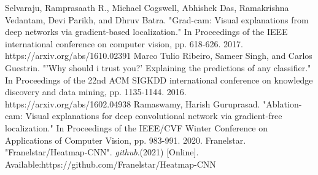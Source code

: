 \documentclass[conference]{IEEEtran}
\begin{document}
\begin{thebibliography}{00}
 Selvaraju, Ramprasaath R., Michael Cogswell, Abhishek Das, Ramakrishna Vedantam, Devi Parikh, and Dhruv Batra. "Grad-cam: Visual explanations from deep networks via gradient-based localization." In Proceedings of the IEEE international conference on computer vision, pp. 618-626. 2017. https://arxiv.org/abs/1610.02391
 Marco Tulio Ribeiro, Sameer Singh, and Carlos Guestrin. "'Why should i trust you?' Explaining the predictions of any classifier." In Proceedings of the 22nd ACM SIGKDD international conference on knowledge discovery and data mining, pp. 1135-1144. 2016. https://arxiv.org/abs/1602.04938
 Ramaswamy, Harish Guruprasad. "Ablation-cam: Visual explanations for deep convolutional 
network via gradient-free localization." In Proceedings of the IEEE/CVF Winter Conference on Applications of Computer Vision, pp. 983-991. 2020. 
Franelstar. "Franelstar/Heatmap-CNN". \textit{github}.(2021) [Online]. Available:https://github.com/Franelstar/Heatmap-CNN


\end{thebibliography}
\end{document}
